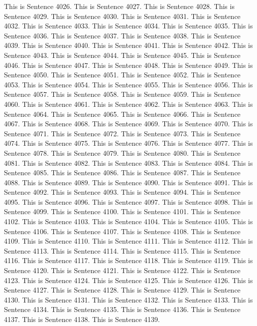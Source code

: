 \documentclass{article}
\begin{document}
This is Sentence 4026.
This is Sentence 4027.
This is Sentence 4028.
This is Sentence 4029.
This is Sentence 4030.
This is Sentence 4031.
This is Sentence 4032.
This is Sentence 4033.
This is Sentence 4034.
This is Sentence 4035.
This is Sentence 4036.
This is Sentence 4037.
This is Sentence 4038.
This is Sentence 4039.
This is Sentence 4040.
This is Sentence 4041.
This is Sentence 4042.
This is Sentence 4043.
This is Sentence 4044.
This is Sentence 4045.
This is Sentence 4046.
This is Sentence 4047.
This is Sentence 4048.
This is Sentence 4049.
This is Sentence 4050.
This is Sentence 4051.
This is Sentence 4052.
This is Sentence 4053.
This is Sentence 4054.
This is Sentence 4055.
This is Sentence 4056.
This is Sentence 4057.
This is Sentence 4058.
This is Sentence 4059.
This is Sentence 4060.
This is Sentence 4061.
This is Sentence 4062.
This is Sentence 4063.
This is Sentence 4064.
This is Sentence 4065.
This is Sentence 4066.
This is Sentence 4067.
This is Sentence 4068.
This is Sentence 4069.
This is Sentence 4070.
This is Sentence 4071.
This is Sentence 4072.
This is Sentence 4073.
This is Sentence 4074.
This is Sentence 4075.
This is Sentence 4076.
This is Sentence 4077.
This is Sentence 4078.
This is Sentence 4079.
This is Sentence 4080.
This is Sentence 4081.
This is Sentence 4082.
This is Sentence 4083.
This is Sentence 4084.
This is Sentence 4085.
This is Sentence 4086.
This is Sentence 4087.
This is Sentence 4088.
This is Sentence 4089.
This is Sentence 4090.
This is Sentence 4091.
This is Sentence 4092.
This is Sentence 4093.
This is Sentence 4094.
This is Sentence 4095.
This is Sentence 4096.
This is Sentence 4097.
This is Sentence 4098.
This is Sentence 4099.
This is Sentence 4100.
This is Sentence 4101.
This is Sentence 4102.
This is Sentence 4103.
This is Sentence 4104.
This is Sentence 4105.
This is Sentence 4106.
This is Sentence 4107.
This is Sentence 4108.
This is Sentence 4109.
This is Sentence 4110.
This is Sentence 4111.
This is Sentence 4112.
This is Sentence 4113.
This is Sentence 4114.
This is Sentence 4115.
This is Sentence 4116.
This is Sentence 4117.
This is Sentence 4118.
This is Sentence 4119.
This is Sentence 4120.
This is Sentence 4121.
This is Sentence 4122.
This is Sentence 4123.
This is Sentence 4124.
This is Sentence 4125.
This is Sentence 4126.
This is Sentence 4127.
This is Sentence 4128.
This is Sentence 4129.
This is Sentence 4130.
This is Sentence 4131.
This is Sentence 4132.
This is Sentence 4133.
This is Sentence 4134.
This is Sentence 4135.
This is Sentence 4136.
This is Sentence 4137.
This is Sentence 4138.
This is Sentence 4139.
\end{document}
